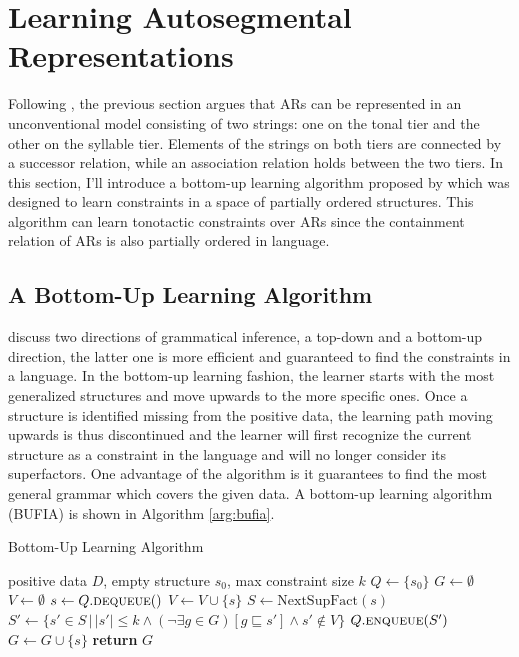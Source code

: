 \documentclass[11pt,letterpaper]{article}
\begin{document}
\section{Learning Autosegmental Representations}
Following \cite{jardineLocalNatureToneassociation2017}, the previous section argues that ARs can be represented in an unconventional model consisting of two strings: one on the tonal tier and the other on the syllable tier. Elements of the strings on both tiers are connected by a successor relation, while an association relation holds between the two tiers. In this section, I'll introduce a bottom-up learning algorithm proposed by \cite{chandleeLearningPartiallyOrdered2019} which was designed to learn constraints in a space of partially ordered structures. This algorithm can learn tonotactic constraints over ARs since the containment relation of ARs is also partially ordered in language.

\subsection{A Bottom-Up Learning Algorithm}
\cite{chandleeLearningPartiallyOrdered2019} discuss two directions of grammatical inference, a top-down and a bottom-up direction, the latter one is more efficient and guaranteed to find the constraints in a language. In the bottom-up learning fashion, the learner starts with the most generalized structures and move upwards to the more specific ones. Once a structure is identified missing from the positive data, the learning path moving upwards is thus discontinued and the learner will first recognize the current structure as a constraint in the language and will no longer consider its superfactors. One advantage of the algorithm is it guarantees to find the most general grammar which covers the given data. A bottom-up learning algorithm (BUFIA) is shown in Algorithm \ref{arg:bufia}.

\begin{minipage}{0.9\linewidth}
\centering
\begin{algorithm}[H]
	\caption{Bottom-Up Learning Algorithm}
	 \label{arg:bufia}
	\begin{algorithmic}
		\Require positive data $D$, empty structure $s_0$, max constraint size $k$
		\State $Q \gets \{s_0\}$ 
		\State $G \gets \emptyset$
		\State $V \gets \emptyset$
		\State $s \gets Q.\textsc{dequeue}()$
		\State $V \gets V \cup \{s\}$
		\State $S \gets \text{NextSupFact}(s)$
		\State $S' \gets \{s' \in S \,|\, |s'| \leq k \land (\lnot \exists g \in G)[g \sqsubseteq s'] \land s' \notin V\}$
		\State $Q. \textsc{enqueue}(S')$
		\Else 
		\State $G \gets G \cup \{s\}$
		\EndIf
		\EndWhile
		\State \textbf{return} $G$
	\end{algorithmic}
\end{algorithm}
\end{minipage}
\\
\end{document}
